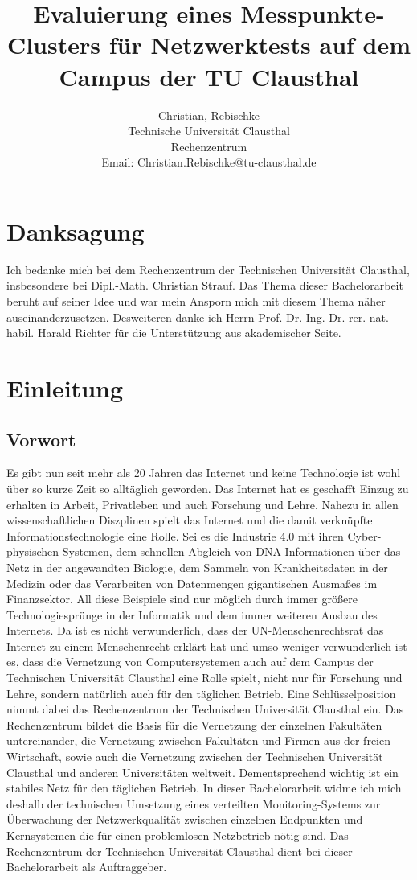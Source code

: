 \documentclass[titlepage]{report}
\title{Evaluierung eines Messpunkte-Clusters für Netzwerktests auf dem
Campus der TU Clausthal}
\author{Christian, Rebischke\\
Technische Universität Clausthal\\
Rechenzentrum\\
Email: Christian.Rebischke@tu-clausthal.de}
\begin{document}
\maketitle
\chapter*{Danksagung}
Ich bedanke mich bei dem Rechenzentrum der Technischen Universität
Clausthal, insbesondere bei Dipl.\hyp{}Math. Christian Strauf. Das Thema
dieser Bachelorarbeit beruht auf seiner Idee und war mein Ansporn mich
mit diesem Thema näher auseinanderzusetzen. Desweiteren danke ich Herrn
Prof. Dr.\hyp{}Ing. Dr. rer. nat. habil. Harald Richter für die Unterstützung
aus akademischer Seite.
\tableofcontents
\chapter*{Einleitung}
\section*{Vorwort}
Es gibt nun seit mehr als 20 Jahren das Internet und keine Technologie
ist wohl über so kurze Zeit so alltäglich geworden. Das Internet hat es
geschafft Einzug zu erhalten in Arbeit, Privatleben und auch Forschung
und Lehre. Nahezu in allen wissenschaftlichen Diszplinen spielt das
Internet und die damit verknüpfte Informationstechnologie eine Rolle.
Sei es die Industrie 4.0 mit ihren Cyber-physischen Systemen, dem
schnellen Abgleich von DNA-Informationen über das Netz in der
angewandten Biologie, dem Sammeln von Krankheitsdaten in der Medizin
oder das Verarbeiten von Datenmengen gigantischen Ausmaßes im
Finanzsektor. All diese Beispiele sind nur möglich durch immer größere
Technologiesprünge in der Informatik und dem immer weiteren Ausbau des
Internets. Da ist es nicht verwunderlich, dass der UN-Menschenrechtsrat das
Internet zu einem Menschenrecht\cite{UNHRC} erklärt hat und umso weniger
verwunderlich ist es, dass die Vernetzung von Computersystemen auch auf
dem Campus der Technischen Universität Clausthal eine Rolle spielt,
nicht nur für Forschung und Lehre, sondern natürlich auch für den
täglichen Betrieb. Eine Schlüsselposition nimmt dabei das Rechenzentrum
der Technischen Universität Clausthal ein. Das Rechenzentrum bildet die
Basis für die Vernetzung der einzelnen Fakultäten untereinander, die
Vernetzung zwischen Fakultäten und Firmen aus der freien Wirtschaft,
sowie auch die Vernetzung zwischen der Technischen Universität Clausthal
und anderen Universitäten weltweit. Dementsprechend wichtig ist ein
stabiles Netz für den täglichen Betrieb. In dieser Bachelorarbeit widme
ich mich deshalb der technischen Umsetzung eines verteilten
Monitoring-Systems zur Überwachung der Netzwerkqualität zwischen
einzelnen Endpunkten und Kernsystemen die für einen problemlosen
Netzbetrieb nötig sind. Das Rechenzentrum der Technischen Universität
Clausthal dient bei dieser Bachelorarbeit als Auftraggeber.
\end{document}

